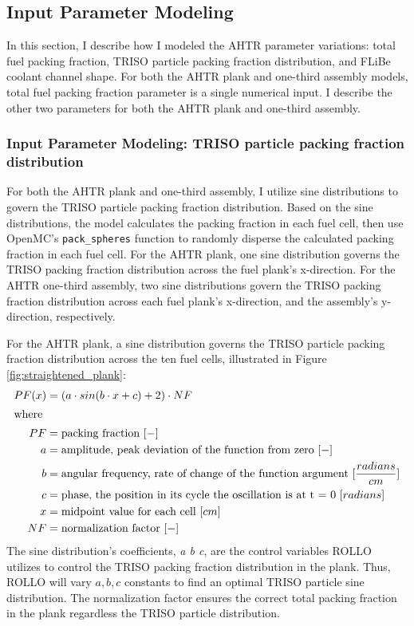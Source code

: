 \subsection{Input Parameter Modeling}
In this section, I describe how I modeled the \gls{AHTR} parameter variations: total fuel packing 
fraction, \gls{TRISO} particle packing fraction distribution, and \gls{FLiBe} coolant channel shape. 
For both the \gls{AHTR} plank and one-third assembly models, total fuel packing fraction parameter 
is a single numerical input.
I describe the other two parameters for both the \gls{AHTR} plank and one-third assembly. 

\subsubsection{Input Parameter Modeling: TRISO particle packing fraction distribution}
For both the \gls{AHTR} plank and one-third assembly, I utilize sine distributions to govern the 
\gls{TRISO} particle packing fraction distribution. 
Based on the sine distributions, the model calculates the packing fraction in each fuel cell, then use 
OpenMC's \texttt{pack\_spheres} function to randomly disperse the calculated packing fraction in each 
fuel cell. 
For the \gls{AHTR} plank, one sine distribution governs the \gls{TRISO} packing fraction distribution 
across the fuel plank's x-direction. 
For the \gls{AHTR} one-third assembly, two sine distributions govern the \gls{TRISO} packing fraction 
distribution across each fuel plank's x-direction, and the assembly's y-direction, respectively. 

For the \gls{AHTR} plank, a sine distribution governs the \gls{TRISO} particle packing fraction 
distribution across the ten fuel cells, illustrated in Figure \ref{fig:straightened_plank}:
\begin{align}
    PF(x) &= \left(a\cdot sin(b\cdot x + c) + 2\right) \cdot NF\\
    \intertext{where}
    PF &= \mbox{packing fraction } [-] \nonumber \\ 
    a &= \mbox{amplitude, peak deviation of the function from zero } [-] \nonumber \\
    b &= \mbox{angular frequency, rate of change of the function argument } [\frac{radians}{cm}] \nonumber \\
    c &= \mbox{phase, the position in its cycle the oscillation is at t = 0 } [radians]\nonumber \\
    x &= \mbox{midpoint value for each cell } [cm]\nonumber \\
    NF &= \mbox{normalization factor } [-]\nonumber
\end{align}
The sine distribution's coefficients, \textit{a b c}, are the control variables \gls{ROLLO} 
utilizes to control the TRISO packing fraction distribution in the plank.
Thus, \gls{ROLLO} will vary $a, b, c$ constants to find an optimal TRISO particle 
sine distribution. 
The normalization factor ensures the correct total packing fraction 
in the plank regardless the \gls{TRISO} particle distribution.

